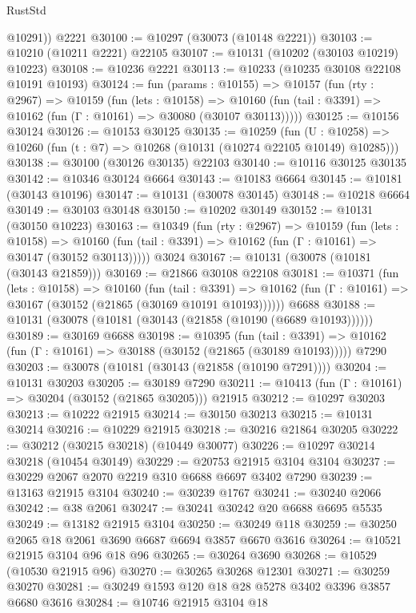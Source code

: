 \begin{lexlean}{RustStd}
\begin{coremodule}
        @10291))
    @2221
@30100 := @10297 (@30073 (@10148 @2221))
@30103 := @10210 (@10211 @2221) @22105
@30107 := @10131 (@10202 (@30103 @10219) @10223)
@30108 := @10236 @2221
@30113 := @10233 (@10235 @30108 @22108 @10191 @10193)
@30124 := fun (params : @10155) =>
  @10157
    (fun (rty : @2967) =>
    @10159
      (fun (lets : @10158) =>
      @10160 (fun (tail : @3391) => @10162 (fun (Γ : @10161) => @30080 (@30107 @30113)))))
@30125 := @10156 @30124
@30126 := @10153 @30125
@30135 := @10259
    (fun (U : @10258) => @10260 (fun (t : @7) => @10268 (@10131 (@10274 @22105 @10149) @10285)))
@30138 := @30100 (@30126 @30135) @22103
@30140 := @10116 @30125 @30135
@30142 := @10346 @30124 @6664
@30143 := @10183 @6664
@30145 := @10181 (@30143 @10196)
@30147 := @10131 (@30078 @30145)
@30148 := @10218 @6664
@30149 := @30103 @30148
@30150 := @10202 @30149
@30152 := @10131 (@30150 @10223)
@30163 := @10349
    (fun (rty : @2967) =>
    @10159
      (fun (lets : @10158) =>
      @10160 (fun (tail : @3391) => @10162 (fun (Γ : @10161) => @30147 (@30152 @30113)))))
    @3024
@30167 := @10131 (@30078 (@10181 (@30143 @21859)))
@30169 := @21866 @30108 @22108
@30181 := @10371
    (fun (lets : @10158) =>
    @10160
      (fun (tail : @3391) =>
      @10162 (fun (Γ : @10161) => @30167 (@30152 (@21865 (@30169 @10191 @10193))))))
    @6688
@30188 := @10131 (@30078 (@10181 (@30143 (@21858 (@10190 (@6689 @10193))))))
@30189 := @30169 @6688
@30198 := @10395
    (fun (tail : @3391) => @10162 (fun (Γ : @10161) => @30188 (@30152 (@21865 (@30189 @10193)))))
    @7290
@30203 := @30078 (@10181 (@30143 (@21858 (@10190 @7291))))
@30204 := @10131 @30203
@30205 := @30189 @7290
@30211 := @10413 (fun (Γ : @10161) => @30204 (@30152 (@21865 @30205))) @21915
@30212 := @10297 @30203
@30213 := @10222 @21915
@30214 := @30150 @30213
@30215 := @10131 @30214
@30216 := @10229 @21915
@30218 := @30216 @21864 @30205
@30222 := @30212 (@30215 @30218) (@10449 @30077)
@30226 := @10297 @30214 @30218 (@10454 @30149)
@30229 := @20753 @21915 @3104 @3104
@30237 := @30229 @2067 @2070 @2219 @310 @6688 @6697 @3402 @7290
@30239 := @13163 @21915 @3104
@30240 := @30239 @1767
@30241 := @30240 @2066
@30242 := @38 @2061
@30247 := @30241 @30242 @20 @6688 @6695 @5535
@30249 := @13182 @21915 @3104
@30250 := @30249 @118
@30259 := @30250 @2065 @18 @2061 @3690 @6687 @6694 @3857 @6670 @3616
@30264 := @10521 @21915 @3104 @96 @18 @96
@30265 := @30264 @3690
@30268 := @10529 (@10530 @21915 @96)
@30270 := @30265 @30268 @12301
@30271 := @30259 @30270
@30281 := @30249 @1593 @120 @18 @28 @5278 @3402 @3396 @3857 @6680 @3616
@30284 := @10746 @21915 @3104 @18

\end{coremodule}
\end{lexlean}

